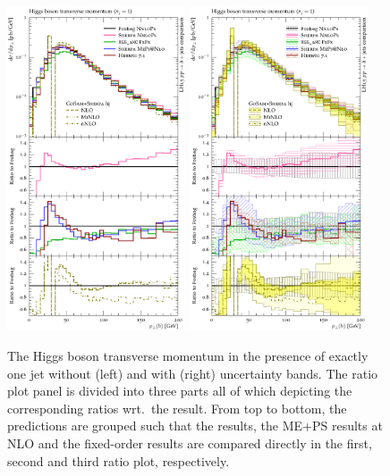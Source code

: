 \begin{figure}[t!]
  \includegraphics[width=0.47\textwidth]{figures/hjetscomp_u_H_j_pT_excl.pdf}
  \hfill
  \includegraphics[width=0.47\textwidth]{figures/hjetscomp_H_j_pT_excl.pdf}
  \caption{\label{fig:hjetscomp:results:1obs:hpt_excl}%
    The Higgs boson transverse momentum in the presence of exactly one
    jet without (left) and with (right) uncertainty bands. The ratio
    plot panel is divided into three parts all of which depicting the
    corresponding ratios wrt.~the \Powheg \NNLOPS result. From top to
    bottom, the predictions are grouped such that the \NNLOPS results,
    the ME+PS results at NLO and the fixed-order results are compared
    directly in the first, second and third ratio plot, respectively.}
\end{figure}

